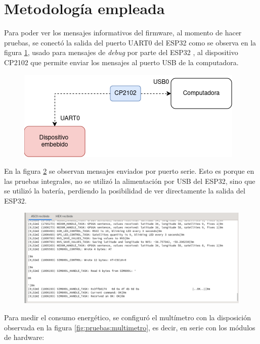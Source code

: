 \section{Metodología empleada}

Para poder ver los mensajes informativos del firmware, al momento de hacer pruebas, se conectó la salida del puerto UART0 del ESP32 como se observa en la figura \ref{fig:cp2102}, usado para mensajes de \textit{debug} por parte del ESP32 \citep{UART:1}, al dispositivo CP2102 que permite enviar los mensajes al puerto USB de la computadora.

\begin{figure}[H]
	\centering
    \includegraphics[width=0.6\linewidth]{./Figures/cp2102.png}
    \label{fig:cp2102}
\end{figure}

En la figura \ref{fig:esp32:debug} se observan mensajes enviados por puerto serie. Esto es porque en las pruebas integrales, no se utilizó la alimentación por USB del ESP32, sino que se utilizó la batería, perdiendo la posibilidad de ver directamente la salida del ESP32.

\begin{figure}[H]
	\centering
    \includegraphics[width=0.95\linewidth]{./Figures/moserial-debug.png}
    \label{fig:esp32:debug}
\end{figure}


Para medir el consumo energético, se configuró el multímetro con la disposición observada en la figura \ref{fig:pruebas:multimetro}, es decir, en serie con los módulos de hardware:

